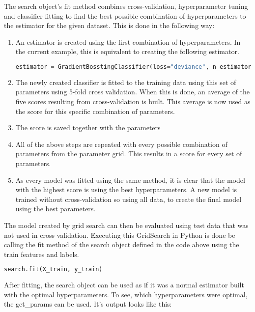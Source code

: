 The search object's fit method combines cross-validation, hyperparameter tuning and classifier
fitting to find the best possible combination of hyperparameters to the estimator for the given dataset.
This is done in the following way:

\begin{enumerate}
    \item An estimator is created using the first combination of hyperparameters. In the current
    example, this is equivalent to creating the following estimator.
    \begin{lstlisting}[language=Python]
        estimator = GradientBosstingClassifier(loss="deviance", n_estimators=97, learning_rate=0.8, criterion='friedman_mse', min_samples_split=1, min_samples_leaf=1, max_depth=1, random_state=42, max_features=None)
    \end{lstlisting}
    \item The newly created classifier is fitted to the training data using this set of parameters using 5-fold cross validation.
    When this is done, an average of the five scores resulting from cross-validation is built.
    This average is now used as the score for this specific combination of parameters.
    \item The score is saved together with the parameters
    \item All of the above steps are repeated with every possible combination of parameters from the 
    parameter grid. This results in a score for every set of parameters.
    \item As every model was fitted using the same method, it is clear that the model with the highest
    score is using the best hyperparameters. A new model is trained without cross-validation so using all
    data, to create the final model using the best parameters.
\end{enumerate}

The model created by grid search can then be evaluated using test data that was not used in cross validation.
Executing this GridSearch in Python is done be calling the fit method of the search object defined in the code above 
using the train features and labels.

\begin{lstlisting}[language=Python]
    search.fit(X_train, y_train)
\end{lstlisting}

After fitting, the search object can be used as if it was a normal estimator built with the optimal 
hyperparameters.
To see, which hyperparameters were optimal, the get\_params can be used.
It's output looks like this:

